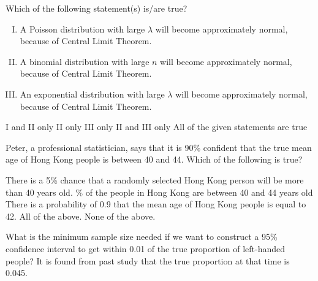 \documentclass[letterpaper,10pt,addpoints]{exam}
\begin{document}
\begin{questions}
  \question Which of the following statement(s) is/are true?
  \begin{enumerate}[I.]
    \item A Poisson distribution with large $\lambda$ will become approximately normal, because of Central Limit Theorem.
    \item A binomial distribution with large $n$ will become approximately normal, because of Central Limit Theorem.
    \item An exponential distribution with large $\lambda$ will become approximately normal, because of Central Limit Theorem.
  \end{enumerate}
  \begin{choices}
    \correctchoice I and II only
    \choice II only
    \choice III only
    \choice II and III only
    \choice All of the given statements are true
    \end{choices}

\question Peter, a professional statistician, says that it is 90\% confident that the true mean age of Hong Kong people is between 40 and 44. Which of the following is true?
\begin{choices}
  \choice There is a 5\% chance that a randomly selected Hong Kong person will be more than 40 years old.
  \% of the people in Hong Kong are between 40 and 44 years old
  \choice There is a probability of 0.9 that the mean age of Hong Kong people is equal to 42.
  \choice All of the above.
  \correctchoice None of the above.
\end{choices}


\question What is the minimum sample size needed if we want to construct a 95\% confidence interval to get within 0.01 of the true proportion of left-handed people? It is found from past study that the true proportion at that time is 0.045.
\begin{choices}
\end{choices}



\end{questions}
\end{document}
